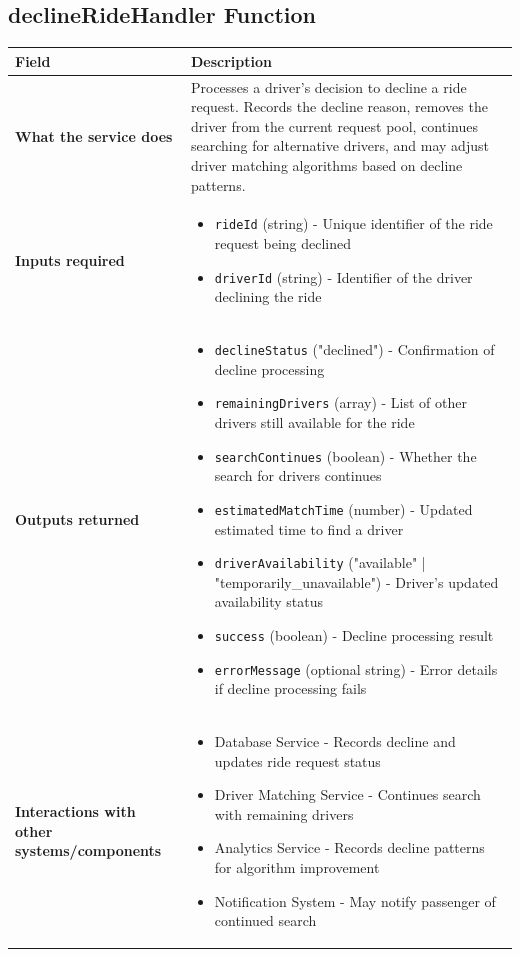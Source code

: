 \documentclass[11pt,a4paper]{article}
\begin{document}
\subsection{declineRideHandler Function}

\begin{longtable}{|p{4cm}|p{12cm}|}
\hline
\textbf{Field} & \textbf{Description} \\
\hline
\textbf{What the service does} & 
Processes a driver's decision to decline a ride request. Records the decline reason, removes the driver from the current request pool, continues searching for alternative drivers, and may adjust driver matching algorithms based on decline patterns. \\
\hline
\textbf{Inputs required} & 
\begin{itemize}[nosep]
\item \texttt{rideId} (string) - Unique identifier of the ride request being declined
\item \texttt{driverId} (string) - Identifier of the driver declining the ride
\end{itemize} \\
\hline
\textbf{Outputs returned} & 
\begin{itemize}[nosep]
\item \texttt{declineStatus} ("declined") - Confirmation of decline processing
\item \texttt{remainingDrivers} (array) - List of other drivers still available for the ride
\item \texttt{searchContinues} (boolean) - Whether the search for drivers continues
\item \texttt{estimatedMatchTime} (number) - Updated estimated time to find a driver
\item \texttt{driverAvailability} ("available" | "temporarily\_unavailable") - Driver's updated availability status
\item \texttt{success} (boolean) - Decline processing result
\item \texttt{errorMessage} (optional string) - Error details if decline processing fails
\end{itemize} \\
\hline
\textbf{Interactions with other systems/components} & 
\begin{itemize}[nosep]
\item Database Service - Records decline and updates ride request status
\item Driver Matching Service - Continues search with remaining drivers
\item Analytics Service - Records decline patterns for algorithm improvement
\item Notification System - May notify passenger of continued search
\end{itemize} \\
\hline
\end{longtable}
\end{document}
